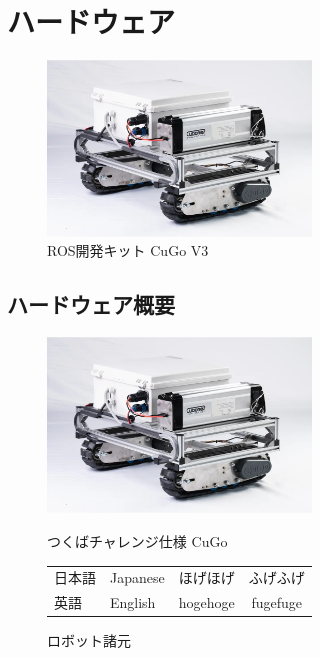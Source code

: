 \documentclass[platex,dvipdfmx]{rbproceedings}
\begin{document}
\section{ハードウェア}
\begin{figure}[htbp]
    \centering   
    \includegraphics[keepaspectratio,width=70mm]{fig/cugo_ros.jpg}
    \caption{ROS開発キット CuGo V3}
    \label{fig:cugo_ros}
\end{figure}



\subsection{ハードウェア概要}
\begin{figure}[htbp]
    \centering
    \begin{minipage}[b]{0.45\linewidth}
        \centering
        \includegraphics[keepaspectratio,width=70mm]{fig/cugo_ros.jpg}
        \caption{つくばチャレンジ仕様 CuGo}
        \label{fig:cugo_ros_tsukuba}
    \end{minipage}
    \begin{minipage}[b]{0.45\linewidth}
        \centering
        \begin{tabular}{llcc}
            \hline
            日本語 & Japanese & ほげほげ & ふげふげ \\
            英語 & English & hogehoge & fugefuge \\
            \hline
        \end{tabular}
        \caption{ロボット諸元}
        \label{fig:cugo_ros_tsukuba_spec}
    \end{minipage}
\end{figure}
\end{document}
